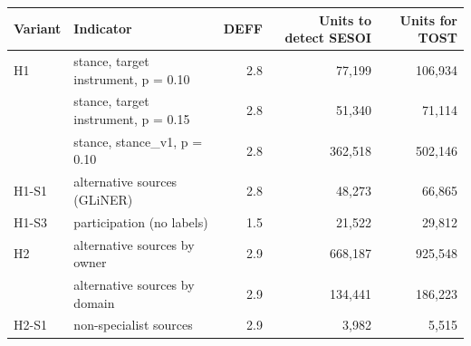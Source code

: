 \begin{tabular}{llrrr}
\toprule
Variant & Indicator & DEFF & Units to detect SESOI & Units for TOST \\
\midrule
H1 & stance, target instrument, p = 0.10 & 2.8 & 77,199 & 106,934 \\
 & stance, target instrument, p = 0.15 & 2.8 & 51,340 & 71,114 \\
 & stance, stance\_v1, p = 0.10 & 2.8 & 362,518 & 502,146 \\
\midrule
H1-S1 & alternative sources (GLiNER) & 2.8 & 48,273 & 66,865 \\
H1-S3 & participation (no labels) & 1.5 & 21,522 & 29,812 \\
\midrule
H2 & alternative sources by owner & 2.9 & 668,187 & 925,548 \\
 & alternative sources by domain & 2.9 & 134,441 & 186,223 \\
H2-S1 & non-specialist sources & 2.9 & 3,982 & 5,515 \\
\bottomrule
\end{tabular}
